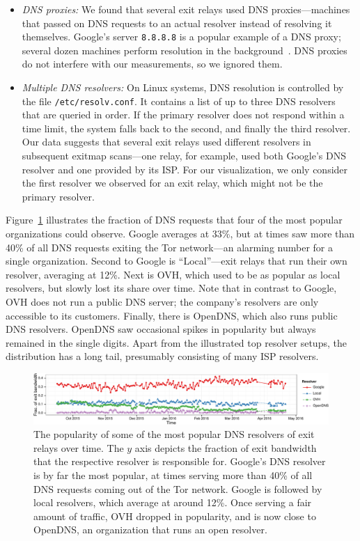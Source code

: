 \begin{itemize}
\item {\em DNS proxies:}
We found that several exit relays used DNS
proxies---machines that passed on DNS requests to an actual resolver
instead of resolving it themselves.  Google's server {\tt 8.8.8.8} is a popular
example of a DNS proxy;
several dozen machines perform resolution in the
background~\cite{google-proxies}.  DNS proxies do
not interfere with our measurements, so we ignored them.

\item {\em Multiple DNS resolvers:}
On Linux systems, DNS resolution is controlled by the file
\texttt{/etc/resolv.conf}.  It contains a list of up to three DNS resolvers
that are queried in order.  If the primary resolver does not respond within a
time limit, the system falls back to the second, and finally the third
resolver.  Our data suggests that several exit relays used
different resolvers in subsequent exitmap scans---one relay, for example, used
both Google's DNS resolver and one provided by its ISP.  For our visualization,
we only consider the first resolver we observed for an exit relay, which might
not be the primary resolver.
\end{itemize}
\noindent
Figure~\ref{fig:exit-resolvers} illustrates the fraction of DNS requests that
four of the most popular organizations could observe.  Google averages at 33\%,
but at times saw more than 40\% of all DNS requests exiting the Tor network---an
alarming number for a single organization.  Second to Google is ``Local''---exit
relays that run their own resolver, averaging at 12\%.  Next is OVH, which used
to be as popular as local resolvers, but slowly lost its share over time.  Note
that in contrast to Google, OVH does not run a public DNS server; the company's
resolvers are only accessible to its customers.  Finally, there is OpenDNS,
which also runs public DNS resolvers.  OpenDNS saw occasional spikes in
popularity but always remained in the single digits.  Apart from the illustrated
top resolver setups, the distribution has a long tail, presumably consisting of
many ISP resolvers.

\begin{figure}[t]
	\centering
	\includegraphics[width=\linewidth]{figures/exit-resolvers.pdf}
	\caption{The popularity of some of the most popular DNS resolvers of exit
		relays over time.  The $y$ axis depicts the fraction of exit bandwidth
		that the respective resolver is responsible for.  Google's DNS resolver
		is by far the most popular, at times serving more than 40\% of all DNS
		requests coming out of the Tor network.  Google is followed by local
		resolvers, which average at around 12\%.  Once serving a fair amount of
		traffic, OVH dropped in popularity, and is now close to OpenDNS, an
		organization that runs an open resolver.}
	\label{fig:exit-resolvers}
\end{figure}

